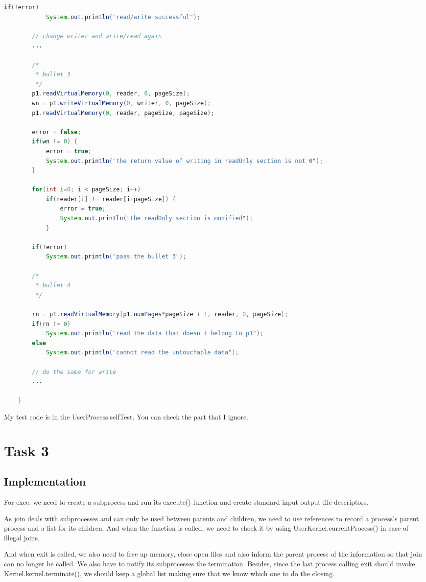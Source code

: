\documentclass{article}
\begin{document}
\begin{spacing}{1.1}
\begin{lstlisting}[language=Java]
    	if(!error)
    		System.out.println("read/write successful");
    	
    	// change writer and write/read again
    	...

    	/*
    	 * bullet 3
    	 */
    	p1.readVirtualMemory(0, reader, 0, pageSize);
    	wn = p1.writeVirtualMemory(0, writer, 0, pageSize);
    	p1.readVirtualMemory(0, reader, pageSize, pageSize);
    	
    	error = false;
    	if(wn != 0) {
    		error = true;
    		System.out.println("the return value of writing in readOnly section is not 0");
    	}
    	
    	for(int i=0; i < pageSize; i++)
    		if(reader[i] != reader[i+pageSize]) {
    			error = true;
    			System.out.println("the readOnly section is modified");
    		}
    	
    	if(!error)
    		System.out.println("pass the bullet 3");
    	
    	/*
    	 * bullet 4
    	 */
    	
    	rn = p1.readVirtualMemory(p1.numPages*pageSize + 1, reader, 0, pageSize);
    	if(rn != 0)
    		System.out.println("read the data that doesn't belong to p1");
    	else
    		System.out.println("cannot read the untouchable data");
    	
    	// do the same for write
    	...

    }

\end{lstlisting}

My test code is in the \textsf{UserProcess.selfTest}. You can check the part that I ignore.


\section{Task 3}
\subsection{Implementation}
For \textsf{exec}, we need to create a subprocess and run its \textsf{execute()} function and create standard input output file descriptors.

As \textsf{join} deals with subprocesses and can only be used between parents and children, we need to use references to record a process's parent process and a list for its children. And when the function is called, we need to check it by using \textsf{UserKernel.currentProcess()} in case of illegal joins.

And when \textsf{exit} is called, we also need to free up memory, close open files and also inform the parent process of the information so that \textsf{join} can no longer be called. We also have to notify its subprocesses the termination. Besides, since the last process calling \textsf{exit} should invoke \textsf{Kernel.kernel.terminate()}, we should keep a global list making sure that we know which one to do the closing.


\end{spacing}
\end{document}
